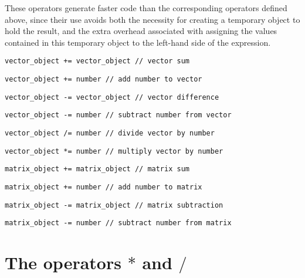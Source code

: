 \documentclass{admbmanual}
\begin{document}
These operators generate faster code than the corresponding operators defined
above, since their use avoids both the necessity for creating a 
temporary object to hold the result, and the extra overhead associated with
assigning the values contained in this temporary object to the left-hand side
of the expression. 
\begin{lstlisting}
vector_object += vector_object // vector sum 
\end{lstlisting}
\begin{lstlisting}
vector_object += number // add number to vector 
\end{lstlisting}
\begin{lstlisting}
vector_object -= vector_object // vector difference 
\end{lstlisting}
\begin{lstlisting}
vector_object -= number // subtract number from vector 
\end{lstlisting}
\begin{lstlisting}
vector_object /= number // divide vector by number 
\end{lstlisting}
\begin{lstlisting}
vector_object *= number // multiply vector by number  
\end{lstlisting}
\begin{lstlisting}
matrix_object += matrix_object // matrix sum 
\end{lstlisting}
\begin{lstlisting}
matrix_object += number // add number to matrix 
\end{lstlisting}
\begin{lstlisting}
matrix_object -= matrix_object // matrix subtraction 
\end{lstlisting}
\begin{lstlisting}
matrix_object -= number // subtract number from matrix 
\end{lstlisting}


\section{The operators $*$ and  $/$} 
\X{$/$}
\end{document}
